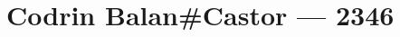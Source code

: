 \hypertarget{codrin-balancastor-2346}{%
\chapter{Codrin Balan\#Castor — 2346}\label{codrin-balancastor-2346}}
